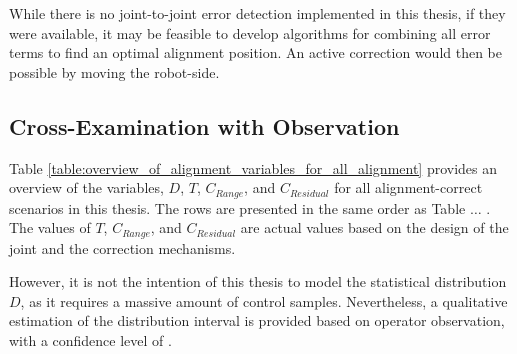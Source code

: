 While there is no joint-to-joint error detection implemented in this thesis, if they were available, it may be feasible to develop algorithms for combining all error terms to find an optimal alignment position. An active correction would then be possible by moving the robot-side.

\subsection{Cross-Examination with Observation}
\label{subsection:new_hypo_cross_examination_with_observation}

Table \ref{table:overview_of_alignment_variables_for_all_alignment} provides an overview of the variables, $D$, $T$, $C_{Range}$, and $C_{Residual}$ for all alignment-correct scenarios in this thesis. The rows are presented in the same order as Table $\ldots$ . The values of $T$, $C_{Range}$, and $C_{Residual}$ are actual values based on the design of the joint and the correction mechanisms. 

However, it is not the intention of this thesis to model the statistical distribution $D$, as it requires a massive amount of control samples. Nevertheless, a qualitative estimation of the distribution interval is provided based on operator observation, with a confidence level of .

